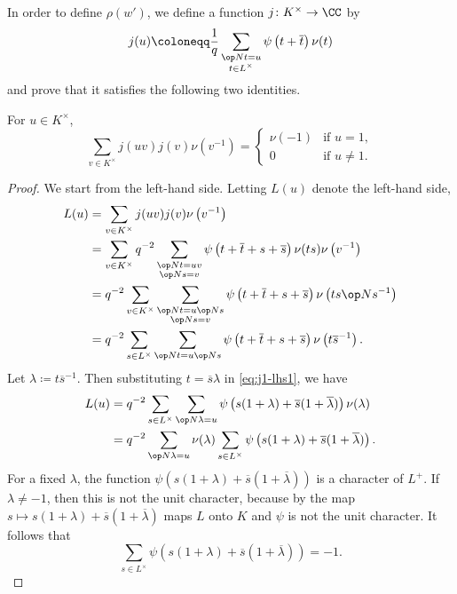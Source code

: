 \documentclass[../main.tex]{subfiles}
\begin{document}
In order to define $\rho(w')$, we define a function $j\colon K^\times\to\CC$ by
\[j(u)\coloneqq\frac1q\sum_{\substack{\op Nt=u\\t\in L^\times}}\psi\left(t+\overline t\right)\nu(t)\]
and prove that it satisfies the following two identities.
\begin{lemma} \label{lem:j1}
	For $u\in K^\times$,
	\[\sum_{v\in K^\times}j(uv)j(v)\nu\left(v^{-1}\right)=\begin{cases}
		\nu(-1) & \text{if }u=1, \\
		0 & \text{if }u\ne1.
	\end{cases}\]
\end{lemma}
\begin{proof}
	We start from the left-hand side. Letting $L(u)$ denote the left-hand side,
	\begin{align}
		L(u) &= \sum_{v\in K^\times}j(uv)j(v)\nu\left(v^{-1}\right) \notag \\
		&= \sum_{v\in K^\times}q^{-2}\sum_{\substack{\op Nt=uv\\\op Ns=v}}\psi\left(t+\overline t+s+\overline s\right)\nu(ts)\nu\left(v^{-1}\right) \notag \\
		&= q^{-2}\sum_{v\in K^\times}\sum_{\substack{\op Nt=u\op Ns\\\op Ns=v}}\psi\left(t+\overline t+s+\overline s\right)\nu\left(ts\op Ns^{-1}\right) \notag \\
		&= q^{-2}\sum_{s\in L^\times}\sum_{\op Nt=u\op Ns}\psi\left(t+\overline t+s+\overline s\right)\nu\left(t\overline s^{-1}\right). \label{eq:j1-lhs1}
	\end{align}
	Let $\lambda\coloneqq t\overline s^{-1}$. Then substituting $t=\overline s\lambda$ in \eqref{eq:j1-lhs1}, we have
	\begin{align}
		L(u) &= q^{-2}\sum_{s\in L^\times}\sum_{\op N\lambda=u}\psi\left(s(1+\lambda)+\overline s(1+\overline\lambda)\right)\nu(\lambda) \notag \\
		&= q^{-2}\sum_{\op N\lambda=u}\nu(\lambda)\sum_{s\in L^\times}\psi\left(s(1+\lambda)+\overline s(1+\overline\lambda)\right). \label{eq:j1-lhs2}
	\end{align}
	For a fixed $\lambda$, the function $\psi\left(s(1+\lambda)+\overline s(1+\overline\lambda)\right)$ is a character of $L^+$. If $\lambda\ne-1$, then this is not the unit character, because by  the map $s\mapsto s(1+\lambda)+\overline s(1+\overline\lambda)$ maps $L$ onto $K$ and $\psi$ is not the unit character. It follows that
	\[\sum_{s\in L^\times}\psi\left(s(1+\lambda)+\overline s(1+\overline\lambda)\right)=-1.\]

\end{proof}
\end{document}

